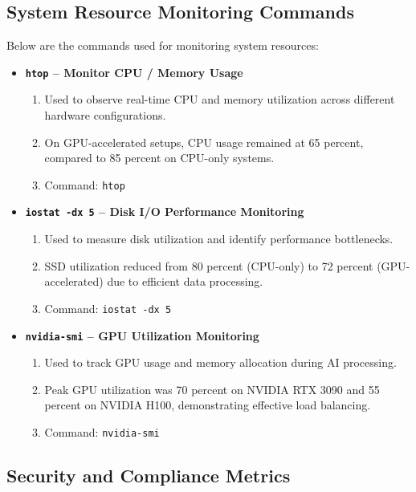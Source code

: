 \subsection{System Resource Monitoring Commands}
\label{subsec_system_resource_monitoring_commands}

Below are the commands used for monitoring system resources:

\begin{itemize}
    \item \textbf{\texttt{htop} -- Monitor CPU / Memory Usage}
    \begin{enumerate}
        \item[a.] Used to observe real-time CPU and memory utilization across different hardware configurations.
        \item[b.] On GPU-accelerated setups, CPU usage remained at 65 percent, compared to 85 percent on CPU-only systems.
        \item[c.] Command: \texttt{htop}
    \end{enumerate}
    \item \textbf{\texttt{iostat -dx 5} -- Disk I/O Performance Monitoring}
    \begin{enumerate}
        \item[a.] Used to measure disk utilization and identify performance bottlenecks.
        \item[b.] SSD utilization reduced from 80 percent (CPU-only) to 72 percent (GPU-accelerated) due to efficient data processing.
        \item[c.] Command: \texttt{iostat -dx 5}
    \end{enumerate}
    \item \textbf{\texttt{nvidia-smi} -- GPU Utilization Monitoring}
    \begin{enumerate}
        \item[a.] Used to track GPU usage and memory allocation during AI processing.
        \item[b.] Peak GPU utilization was 70 percent on NVIDIA RTX 3090 and 55 percent on NVIDIA H100, demonstrating effective load balancing.
        \item[c.] Command: \texttt{nvidia-smi}
    \end{enumerate}
\end{itemize}

\subsection{Security and Compliance Metrics}
\label{subsec_security_and_compliance_metrics}

